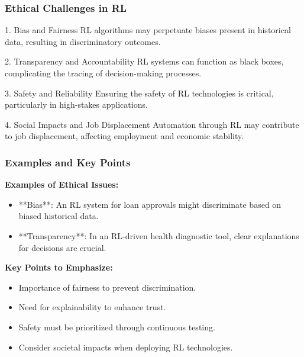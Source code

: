 \documentclass[aspectratio=169]{beamer}
\begin{document}
\begin{frame}[fragile]
    \frametitle{Ethical Challenges in RL}
    \begin{block}{1. Bias and Fairness}
        RL algorithms may perpetuate biases present in historical data, resulting in discriminatory outcomes.
    \end{block}
    
    \begin{block}{2. Transparency and Accountability}
        RL systems can function as black boxes, complicating the tracing of decision-making processes.
    \end{block}
    
    \begin{block}{3. Safety and Reliability}
        Ensuring the safety of RL technologies is critical, particularly in high-stakes applications.
    \end{block}
    
    \begin{block}{4. Social Impacts and Job Displacement}
        Automation through RL may contribute to job displacement, affecting employment and economic stability.
    \end{block}
\end{frame}

\begin{frame}[fragile]
    \frametitle{Examples and Key Points}
    \textbf{Examples of Ethical Issues:}
    
    \begin{itemize}
        \item **Bias**: An RL system for loan approvals might discriminate based on biased historical data.
        \item **Transparency**: In an RL-driven health diagnostic tool, clear explanations for decisions are crucial.
    \end{itemize}

    \textbf{Key Points to Emphasize:}
    
    \begin{itemize}
        \item Importance of fairness to prevent discrimination.
        \item Need for explainability to enhance trust.
        \item Safety must be prioritized through continuous testing.
        \item Consider societal impacts when deploying RL technologies.
    \end{itemize}
\end{frame}
\end{document}
